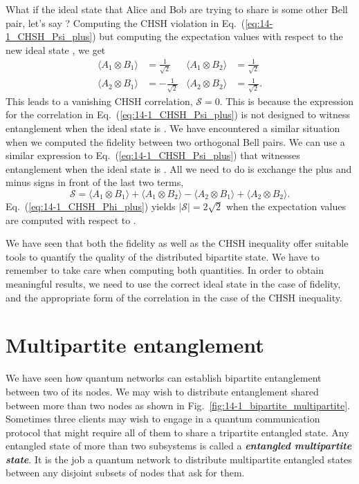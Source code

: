 What if the ideal state that Alice and Bob are trying to share is some other Bell pair, let's say \ket{\Phi^+}?
Computing the CHSH violation in Eq.~(\ref{eq:14-1_CHSH_Psi_plus}) but computing the expectation values with respect to the new ideal state \ket{\Phi^+}, we get
\begin{align}
    \langle A_1 \otimes B_1 \rangle & = \frac{1}{\sqrt{2}} & \langle A_1 \otimes B_2 \rangle & = \frac{1}{\sqrt{2}} \\
    \langle A_2 \otimes B_1 \rangle & = - \frac{1}{\sqrt{2}} & \langle A_2 \otimes B_2 \rangle & = \frac{1}{\sqrt{2}}.
\end{align}
This leads to a vanishing CHSH correlation, $\mathcal{S} = 0$.
This is because the expression for the correlation in Eq.~(\ref{eq:14-1_CHSH_Psi_plus}) is not designed to witness entanglement when the ideal state is \ket{\Phi^+}.
We have encountered a similar situation when we computed the fidelity between two orthogonal Bell pairs.
We can use a similar expression to Eq.~(\ref{eq:14-1_CHSH_Psi_plus}) that witnesses entanglement when the ideal state is \ket{\Phi^+}.
All we need to do is exchange the plus and minus signs in front of the last two terms,
\begin{equation}
    \mathcal{S} = \langle A_1 \otimes B_1\rangle + \langle A_1 \otimes B_2\rangle - \langle A_2 \otimes B_1\rangle + \langle A_2 \otimes B_2\rangle.
    \label{eq:14-1_CHSH_Phi_plus}
\end{equation}
Eq.~(\ref{eq:14-1_CHSH_Phi_plus}) yields $|\mathcal{S}| = 2\sqrt{2}$ when the expectation values are computed with respect to \ket{\Phi^+}.

We have seen that both the fidelity as well as the CHSH inequality offer suitable tools to quantify the quality of the distributed bipartite state.
We have to remember to take care when computing both quantities.
In order to obtain meaningful results, we need to use the correct ideal state in the case of fidelity, and the appropriate form of the correlation in the case of the CHSH inequality.




\section{Multipartite entanglement}
\label{sec:14-2_multipartite}

We have seen how quantum networks can establish bipartite entanglement between two of its nodes.
We may wish to distribute entanglement shared between more than two nodes as shown in Fig.~\ref{fig:14-1_bipartite_multipartite}.
Sometimes three clients may wish to engage in a quantum communication protocol that might require all of them to share a tripartite entangled state.
Any entangled state of more than two subsystems is called a \textit{\textbf{entangled multipartite state}}.
It is the job a quantum network to distribute multipartite entangled states between any disjoint subsets of nodes that ask for them.


